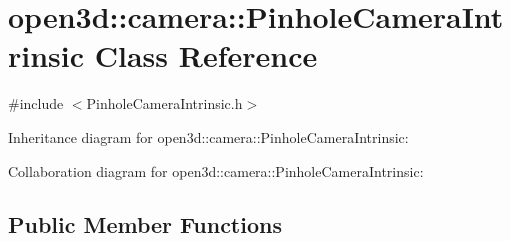\hypertarget{classopen3d_1_1camera_1_1_pinhole_camera_intrinsic}{}\section{open3d\+::camera\+::Pinhole\+Camera\+Intrinsic Class Reference}
\label{classopen3d_1_1camera_1_1_pinhole_camera_intrinsic}


{\ttfamily \#include $<$Pinhole\+Camera\+Intrinsic.\+h$>$}



Inheritance diagram for open3d\+::camera\+::Pinhole\+Camera\+Intrinsic\+:


Collaboration diagram for open3d\+::camera\+::Pinhole\+Camera\+Intrinsic\+:
\subsection*{Public Member Functions}
